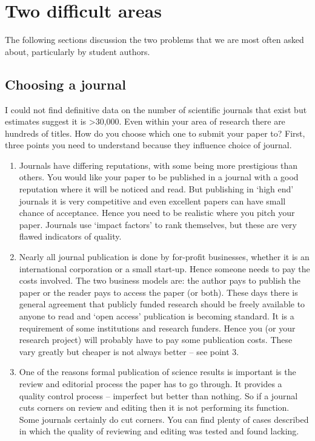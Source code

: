\documentclass[
]{book}
\begin{document}
\hypertarget{two-difficult-areas}{%
\section{Two difficult areas}\label{two-difficult-areas}}

The following sections discussion the two problems that we are most often asked about, particularly by student authors.

\hypertarget{choosing-a-journal}{%
\subsection{Choosing a journal}\label{choosing-a-journal}}

I could not find definitive data on the number of scientific journals that exist but estimates suggest it is \textgreater30,000. Even within your area of research there are hundreds of titles. How do you choose which one to submit your paper to? First, three points you need to understand because they influence choice of journal.

\begin{enumerate}
\def\labelenumi{\arabic{enumi}.}
\item
  Journals have differing reputations, with some being more prestigious than others. You would like your paper to be published in a journal with a good reputation where it will be noticed and read. But publishing in `high end' journals it is very competitive and even excellent papers can have small chance of acceptance. Hence you need to be realistic where you pitch your paper. Journals use `impact factors' to rank themselves, but these are very flawed indicators of quality.
\item
  Nearly all journal publication is done by for-profit businesses, whether it is an international corporation or a small start-up. Hence someone needs to pay the costs involved. The two business models are: the author pays to publish the paper or the reader pays to access the paper (or both). These days there is general agreement that publicly funded research should be freely available to anyone to read and `open access' publication is becoming standard. It is a requirement of some institutions and research funders. Hence you (or your research project) will probably have to pay some publication costs. These vary greatly but cheaper is not always better -- see point 3.
\item
  One of the reasons formal publication of science results is important is the review and editorial process the paper has to go through. It provides a quality control process -- imperfect but better than nothing. So if a journal cuts corners on review and editing then it is not performing its function. Some journals certainly do cut corners. You can find plenty of cases described in which the quality of reviewing and editing was tested and found lacking.
\end{enumerate}
\end{document}
